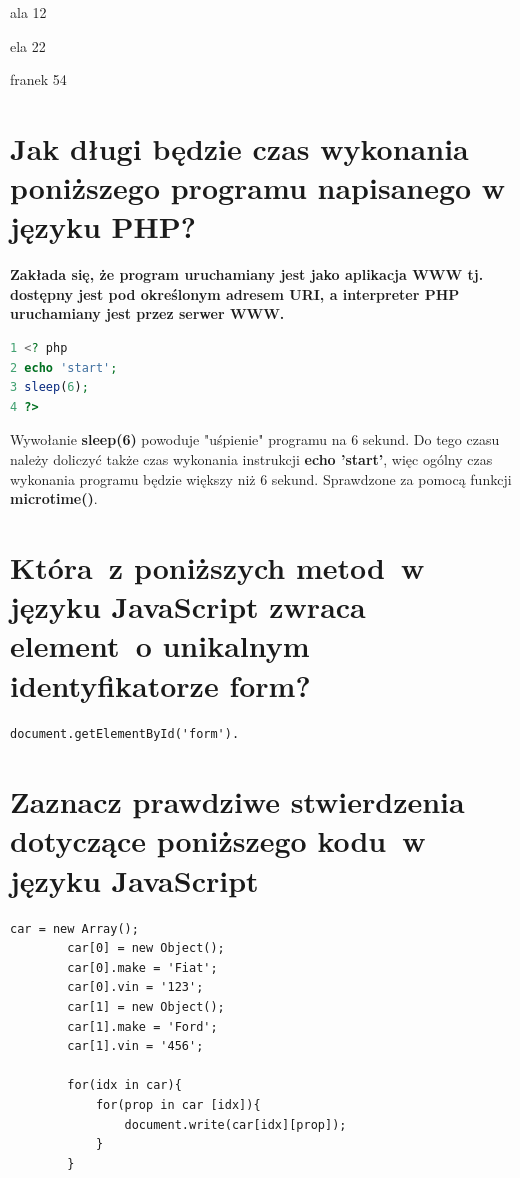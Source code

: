 ala  12

ela  22

franek  54
\vspace{0.4cm}

\section{Jak długi będzie czas wykonania poniższego programu napisanego w języku PHP?}
\textbf{Zakłada się, że program uruchamiany jest jako aplikacja WWW tj. dostępny jest pod określonym adresem URI, a interpreter PHP uruchamiany jest przez serwer WWW.}

\begin{lstlisting}[language=php]
1 <? php
2 echo 'start';
3 sleep(6);
4 ?>

\end{lstlisting}

Wywołanie \textbf{sleep(6)} powoduje "uśpienie" programu na 6 sekund. Do tego czasu należy doliczyć także czas wykonania instrukcji \textbf{echo 'start'}, więc ogólny czas wykonania programu będzie większy niż 6 sekund. Sprawdzone za pomocą funkcji \textbf{microtime()}.

\vspace{0.4cm}
\noindent

\section{Która~z poniższych metod~w języku JavaScript zwraca element~o unikalnym identyfikatorze form?}

\begin{lstlisting}[language=html]
	document.getElementById('form').
\end{lstlisting}


\section{Zaznacz prawdziwe stwierdzenia dotyczące poniższego kodu~w języku JavaScript}

\begin{lstlisting}[language=html]
		car = new Array();
		car[0] = new Object();
		car[0].make = 'Fiat';
		car[0].vin = '123';
		car[1] = new Object();
		car[1].make = 'Ford';
		car[1].vin = '456';
		
		for(idx in car){
			for(prop in car [idx]){
				document.write(car[idx][prop]);
			}
		}
\end{lstlisting}

